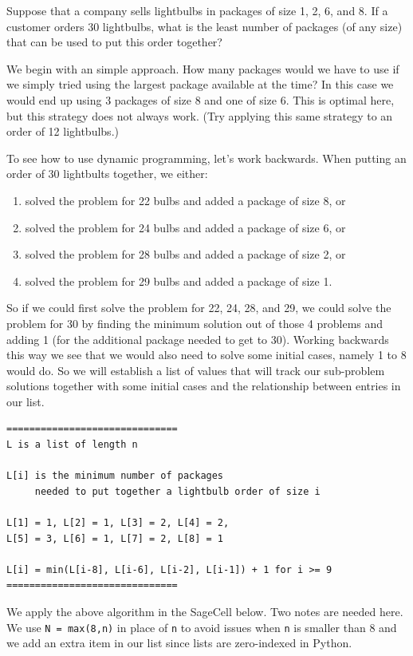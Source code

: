 \documentclass{ximera}
\begin{document}
Suppose that a company sells lightbulbs in packages of size 1, 2, 6, and 8. If a customer orders 30 lightbulbs, what is the least number of packages (of any size) that can be used to put this order together?

We begin with an simple approach. How many packages would we have to use if we simply tried using the largest package available at the time? In this case we would end up using 3 packages of size 8 and one of size 6. This is optimal here, but this strategy does not always work. (Try applying this same strategy to an order of 12 lightbulbs.)

To see how to use dynamic programming, let's work backwards. When putting an order of 30 lightbults together, we either:
\begin{enumerate}
	\item solved the problem for 22 bulbs and added a package of size 8, or 
	\item solved the problem for 24 bulbs and added a package of size 6, or 
	\item solved the problem for 28 bulbs and added a package of size 2, or 
	\item solved the problem for 29 bulbs and added a package of size 1.
\end{enumerate}
So if we could first solve the problem for 22, 24, 28, and 29, we could solve the problem for 30 by finding the minimum solution out of those 4 problems and adding 1 (for the additional package needed to get to 30). Working backwards this way we see that we would also need to solve some initial cases, namely 1 to 8 would do. So we will establish a list of values that will track our sub-problem solutions together with some initial cases and the relationship between entries in our list.
\begin{verbatim}
==============================
L is a list of length n

L[i] is the minimum number of packages 
     needed to put together a lightbulb order of size i

L[1] = 1, L[2] = 1, L[3] = 2, L[4] = 2, 
L[5] = 3, L[6] = 1, L[7] = 2, L[8] = 1

L[i] = min(L[i-8], L[i-6], L[i-2], L[i-1]) + 1 for i >= 9
==============================
\end{verbatim}

We apply the above algorithm in the SageCell below. Two notes are needed here. We use \verb|N = max(8,n)| in place of \verb|n| to avoid issues when \verb|n| is smaller than 8 and we add an extra item in our list since lists are zero-indexed in Python.
\end{document}
